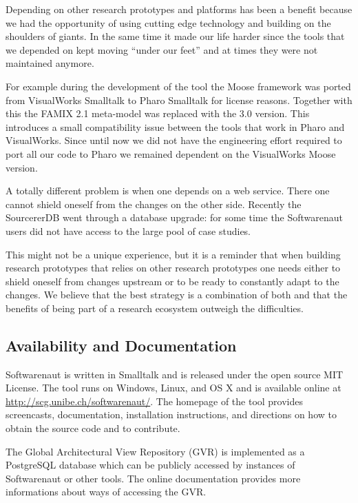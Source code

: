 \documentclass[preprint,12pt]{elsarticle}
\begin{document}
Depending on other research prototypes and platforms has been a benefit because we had the opportunity of using cutting edge technology and building on the shoulders of giants. In the same time it made our life harder since the tools that we depended on kept moving ``under our feet'' and at times they were not maintained anymore. 

For example during the development of the tool the Moose framework was ported from VisualWorks Smalltalk to Pharo Smalltalk for license reasons. Together with this the FAMIX 2.1 meta-model was replaced with the 3.0 version. This introduces a small compatibility issue between the tools that work in Pharo and VisualWorks. Since until now we did not have the engineering effort required to port all our code to Pharo we remained dependent on the VisualWorks Moose version. 

A totally different problem is when one depends on a web service. There one cannot shield oneself from the changes on the other side. Recently the SourcererDB went through a database upgrade: for some time the Softwarenaut users did not have access to the large pool of case studies.

This might not be a unique experience, but it is a reminder that when building research prototypes that relies on other research prototypes one needs either to shield oneself from changes upstream or to be ready to constantly adapt to the changes. We believe that the best strategy is a combination of both and that the benefits of being part of a research ecosystem outweigh the difficulties.

\subsection {Availability and Documentation}

Softwarenaut is written in Smalltalk and is released under the open source MIT License. The tool runs on Windows, Linux, and OS X and is available online at {\footnotesize \url{http://scg.unibe.ch/softwarenaut/}}. The homepage of the tool provides screencasts, documentation, installation instructions, and directions on how to obtain the source code and to contribute.

The Global Architectural View Repository (GVR) is implemented as a PostgreSQL database which can be publicly accessed by instances of Softwarenaut or other tools. The online documentation provides more informations about ways of accessing the GVR. 
\end{document}
